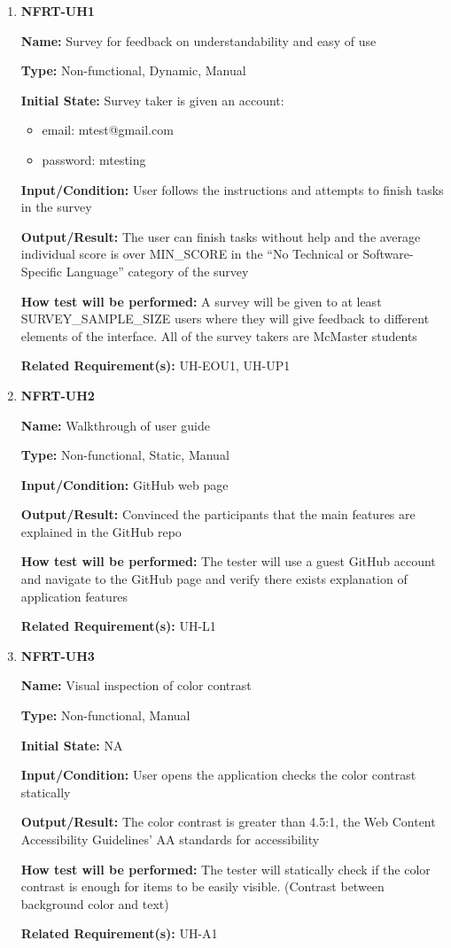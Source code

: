 \documentclass[12pt, titlepage]{article}
\begin{document}
\begin{enumerate}
\item{\textbf{NFRT-UH1}}

\textbf{Name:} Survey for feedback on understandability and easy of use

\textbf{Type:} Non-functional, Dynamic, Manual
					
\textbf{Initial State:} Survey taker is given an account:
\begin{itemize}
\item email: mtest@gmail.com
\item password: mtesting
\end{itemize}

\textbf{Input/Condition:} User follows the instructions and attempts to finish tasks in the survey 
					
\textbf{Output/Result:} The user can finish tasks without help and the average individual score is over MIN\_SCORE in the ``No Technical or Software-Specific Language'' category of the survey
					
\textbf{How test will be performed:} A survey will be given to at least
SURVEY\_SAMPLE\_SIZE users where they will give feedback to different elements of the interface. All of the survey takers are McMaster students

\textbf{Related Requirement(s):} UH-EOU1, UH-UP1

\item{\textbf{NFRT-UH2}}

\textbf{Name:} Walkthrough of user guide 

\textbf{Type:} Non-functional, Static, Manual
					
\textbf{Input/Condition:} GitHub web page
					
\textbf{Output/Result:} Convinced the participants that the main features are explained in the GitHub repo

\textbf{How test will be performed:} The tester will use a guest GitHub account and navigate to the GitHub page and verify there exists explanation of application features

\textbf{Related Requirement(s):} UH-L1

\item{\textbf{NFRT-UH3}}

\textbf{Name:} Visual inspection of color contrast 

\textbf{Type:} Non-functional, Manual
					
\textbf{Initial State:} NA
					
\textbf{Input/Condition:} User opens the application checks the color contrast statically
					
\textbf{Output/Result:} The color contrast is greater than 4.5:1,  the Web Content Accessibility Guidelines' AA standards for accessibility

\textbf{How test will be performed:} The tester will statically check if the color contrast is enough for items to be easily visible. (Contrast between background color and text)

\textbf{Related Requirement(s):} UH-A1
\end{enumerate}
\end{document}
